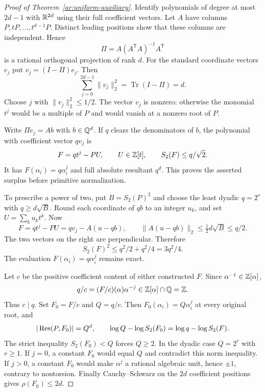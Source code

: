 \begin{proof}[Proof of Theorem~\ref{ar:uniform-auxiliary}]
Identify polynomials of degree at most $2d-1$ with $\mathbb R^{2d}$ using their full coefficient vectors.
Let $A$ have columns $P,tP,\ldots,t^{d-1}P$.
Distinct leading positions show that these columns are independent.
Hence
\[
 \Pi=A(A^{\mathsf T}A)^{-1}A^{\mathsf T}
\]
is a rational orthogonal projection of rank $d$.
For the standard coordinate vectors $e_j$ put $v_j=(I-\Pi)e_j$.
Then
\[
 \sum_{j=0}^{2d-1}\|v_j\|_2^2=\operatorname{Tr}(I-\Pi)=d.
\]
Choose $j$ with $\|v_j\|_2^2\le1/2$.
The vector $v_j$ is nonzero: otherwise the monomial $t^j$ would be a multiple of $P$ and would vanish at a nonzero root of $P$.

Write $\Pi e_j=Ab$ with $b\in\mathbb Q^d$.
If $q$ clears the denominators of $b$, the polynomial with coefficient vector $qv_j$ is
\begin{equation}
 F=q t^j-PU,\qquad U\in\mathbb Z[t],\qquad
 S_2(F)\le q/\sqrt2.
 \label{ar:projection-aux}
\end{equation}
It has $F(\alpha_i)=q\alpha_i^j$ and full absolute resultant $q^d$.
This proves the asserted surplus before primitive normalization.

To prescribe a power of two, put $B=S_2(P)^2$ and choose the least dyadic $q=2^s$ with $q\ge d\sqrt B$.
Round each coordinate of $qb$ to an integer $u_k$, and set $U=\sum_k u_kt^k$.
Now
\[
 F=qt^j-PU=qv_j-A(u-qb),\qquad
 \|A(u-qb)\|_2\le\tfrac12d\sqrt B\le q/2.
\]
The two vectors on the right are perpendicular.
Therefore
\begin{equation}
 S_2(F)^2\le q^2/2+q^2/4=3q^2/4.
 \label{ar:rounding}
\end{equation}
The evaluation $F(\alpha_i)=q\alpha_i^j$ remains exact.

Let $c$ be the positive coefficient content of either constructed $F$.
Since $\alpha^{-1}\in\mathbb Z[\alpha]$,
\[
 q/c=(F/c)(\alpha)\alpha^{-j}\in\mathbb Z[\alpha]\cap\mathbb Q=\mathbb Z.
\]
Thus $c\mid q$.
Set $F_0=F/c$ and $Q=q/c$.
Then $F_0(\alpha_i)=Q\alpha_i^j$ at every original root, and
\[
 |\operatorname{Res}(P,F_0)|=Q^d,\qquad
 \log Q-\log S_2(F_0)=\log q-\log S_2(F).
\]
The strict inequality $S_2(F_0)<Q$ forces $Q\ge2$.
In the dyadic case $Q=2^r$ with $r\ge1$.
If $j=0$, a constant $F_0$ would equal $Q$ and contradict this norm inequality.
If $j>0$, a constant $F_0$ would make $\alpha^j$ a rational algebraic unit, hence $\pm1$, contrary to nontorsion.
Finally Cauchy--Schwarz on the $2d$ coefficient positions gives $\rho(F_0)\le2d$.
\end{proof}

